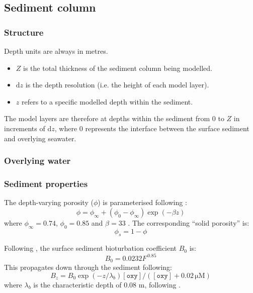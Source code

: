 \documentclass{article}
\newcommand{\D}[1]{\mathrm{d}#1}
\newcommand{\code}[1]{\texttt{#1}}
\newcommand{\conc}[1]{[\code{#1}]}
\newcommand{\uM}{\si{\micro}\mathrm{M}}
\begin{document}
\subsection{Sediment column}

\subsubsection{Structure}

Depth units are always in metres.
\begin{itemize}
  \item $Z$ is the total thickness of the sediment column being modelled.
  \item $\D{z}$ is the depth resolution (i.e. the height of each model layer).
  \item $z$ refers to a specific modelled depth within the sediment.
\end{itemize}
The model layers are therefore at depths within the sediment from $0$ to $Z$ in increments of $\D{z}$, where $0$ represents the interface between the surface sediment and overlying seawater.

\subsubsection{Overlying water}



\subsubsection{Sediment properties}

The depth-varying porosity ($\phi$) is parameterised following \citet{boudreau_method--lines_1996}:
\begin{equation}\label{phi}
\phi = \phi_\infty + (\phi_0 - \phi_\infty) \exp(-\beta z)
\end{equation}
where $\phi_\infty = 0.74$, $\phi_0 = 0.85$ and $\beta = 33$ \citep{boudreau_method--lines_1996}. The corresponding ``solid porosity'' is:
\begin{equation}\label{phiS}
\phi_s = 1 - \phi
\end{equation}

Following \citet{archer_model_2002}, the surface sediment bioturbation coefficient $B_0$ is:
\begin{equation}
B_0 = 0.0232 F^{\,0.85}
\end{equation}
This propagates down through the sediment following:
\begin{equation}
B_z = B_0 \exp(-z/\lambda_b) \conc{oxy} / (\conc{oxy} + 0.02 \, \uM)
\end{equation}
where $\lambda_b$ is the characteristic depth of 0.08 m, following \citet{sayles_benthic_2001}.
\end{document}
